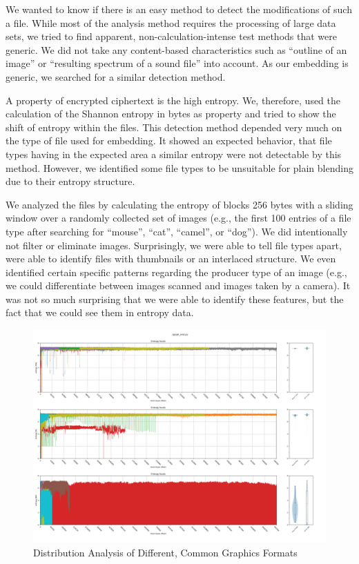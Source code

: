 We wanted to know if there is an easy method to detect the modifications of such a file. While most of the analysis method requires the processing of large data sets, we tried to find apparent, non-calculation-intense test methods that were generic. We did not take any content-based characteristics such as ``outline of an image'' or ``resulting spectrum of a sound file'' into account. As our embedding is generic, we searched for a similar detection method.

A property of encrypted ciphertext is the high entropy. We, therefore, used the calculation of the Shannon entropy in bytes as property and tried to show the shift of entropy within the files. This detection method depended very much on the type of file used for embedding. It showed an expected behavior, that file types having in the expected area a similar entropy were not detectable by this method. However, we identified some file types to be unsuitable for plain blending due to their entropy structure.

We analyzed the files by calculating the entropy of blocks 256 bytes with a sliding window over a randomly collected set of images (e.g., the first 100 entries of a file type after searching for ``mouse'', ``cat'', ``camel'', or ``dog''). We did intentionally not filter or eliminate images. Surprisingly, we were able to tell file types apart, were able to identify files with thumbnails or an interlaced structure. We even identified certain specific patterns regarding the producer type of an image (e.g., we could differentiate between images scanned and images taken by a camera). It was not so much surprising that we were able to identify these features, but the fact that we could see them in entropy data.

\begin{figure}[ht]
	\includegraphics[width=\textwidth]{inc/statanalysis_graph}
	\caption{Distribution Analysis of Different, Common Graphics Formats}
	\label{fig:statGraph}
\end{figure}

